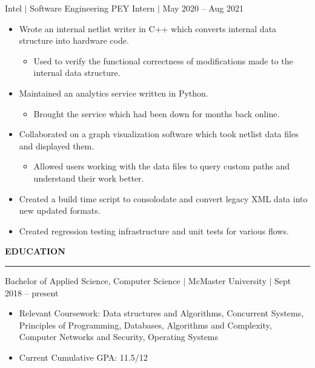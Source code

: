 \documentclass[12pt]{article}
\newcommand{\sectionRule}{\textcolor{gray}{\rule{7.27in}{0.02cm}}}
\newcommand{\sectionTxt}[1]{\noindent\textbf{#1}\\}
\newcommand{\textDate}[3]{\noindent#1 $|$ #2 $|$ {\color{textGray} #3}}
\begin{document}
    \textDate{Intel}{Software Engineering PEY Intern}{May 2020 -- Aug 2021}
    \begin{small}
        \begin{itemize}
            \itemsep0em 
            \item {\color{textGray} Wrote an internal netlist writer in C++ which converts internal data structure into hardware code.}
                \begin{itemize}[label=$\circ$,topsep=-5px,partopsep=0px]
                    \itemsep0em 
                    \item {\color{textGray} Used to verify the functional correctness of modifications made to the internal data structure.}
                \end{itemize}
            \item {\color{textGray} Maintained an analytics service written in Python.}
                \begin{itemize}[label=$\circ$,topsep=-5px,partopsep=0px]
                    \itemsep0em 
                    \item {\color{textGray} Brought the service which had been down for months back online.}
                \end{itemize}
            \item {\color{textGray} Collaborated on a graph visualization software which took netlist data files and displayed them.}
                \begin{itemize}[label=$\circ$,topsep=-5px,partopsep=0px]
                    \itemsep0em 
                    \item {\color{textGray} Allowed users working with the data files to query custom paths and understand their work better.}
                \end{itemize}
            \item {\color{textGray} Created a build time script to consolodate and convert legacy XML data into new updated formats.}
            \item {\color{textGray} Created regression testing infrastructure and unit tests for various flows.}
        \end{itemize}
    \end{small}

    \sectionTxt{EDUCATION}
    \sectionRule

    \textDate{Bachelor of Applied Science, Computer Science}{McMaster University}{Sept 2018 -- present}
    \begin{small}
        \begin{itemize}
            \itemsep0em 
            \item Relevant Coursework: {\color{textGray} Data structures and Algorithms, Concurrent Systems, Principles of Programming, Databases, Algorithms and Complexity, Computer Networks and Security, Operating Systems}
            \item Current Cumulative GPA: {\color{textGray} 11.5/12}
        \end{itemize}
    \end{small}
\end{document}
